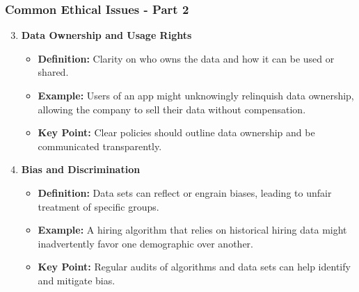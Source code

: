 \documentclass[aspectratio=169]{beamer}
\begin{document}
\begin{frame}[fragile]
    \frametitle{Common Ethical Issues - Part 2}
    \begin{enumerate}
        \setcounter{enumi}{2}
        \item \textbf{Data Ownership and Usage Rights}
            \begin{itemize}
                \item \textbf{Definition:} Clarity on who owns the data and how it can be used or shared.
                \item \textbf{Example:} Users of an app might unknowingly relinquish data ownership, allowing the company to sell their data without compensation.
                \item \textbf{Key Point:} Clear policies should outline data ownership and be communicated transparently.
            \end{itemize}
        
        \item \textbf{Bias and Discrimination}
            \begin{itemize}
                \item \textbf{Definition:} Data sets can reflect or engrain biases, leading to unfair treatment of specific groups.
                \item \textbf{Example:} A hiring algorithm that relies on historical hiring data might inadvertently favor one demographic over another.
                \item \textbf{Key Point:} Regular audits of algorithms and data sets can help identify and mitigate bias.
            \end{itemize}
    \end{enumerate}
\end{frame}
\end{document}
